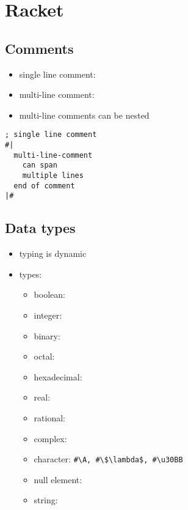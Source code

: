 \documentclass[a4paper,landscape,10pt]{article}
\begin{document}
\section{Racket}
\begin{multicols*}{2}
  \subsection{Comments}

  \begin{itemize}
    \item single line comment: \iracket{;}
    \item multi-line comment: 
    \item multi-line comments can be nested
  \end{itemize}

  \begin{lstlisting}[language=Racket]
; single line comment
#|
  multi-line-comment
	can span
	multiple lines
  end of comment
|#
\end{lstlisting}

  \subsection{Data types}

  \begin{itemize}
    \item typing is dynamic
    \item types:
          \begin{itemize}
            \item boolean: 
            \item integer: 
            \item binary: 
            \item octal: 
            \item hexadecimal: 
            \item real: 
            \item rational: 
            \item complex: 
            \item character: \lstinline[language=Racket, mathescape=true]!#\A, #\$\lambda$, #\u30BB!
            \item null element: 
            \item string: 
          \end{itemize}
  \end{itemize}


\end{multicols*}
\end{document}
